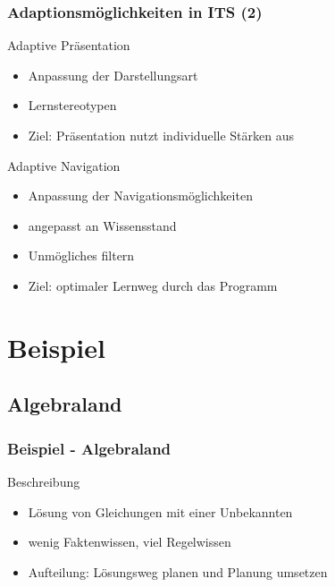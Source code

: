 \documentclass{beamer}
\begin{document}
\begin{frame}
  \frametitle{Adaptionsmöglichkeiten in ITS (2)}

  \begin{block}{Adaptive Präsentation}
    \begin{itemize}
      \item Anpassung der Darstellungsart
      \item Lernstereotypen
      \item Ziel: Präsentation nutzt individuelle Stärken aus
    \end{itemize}
  \end{block}

  \begin{block}{Adaptive Navigation}
    \begin{itemize}
      \item Anpassung der Navigationsmöglichkeiten
      \item angepasst an Wissensstand
      \item Unmögliches filtern
      \item Ziel: optimaler Lernweg durch das Programm
    \end{itemize}
  \end{block}
\end{frame}

\section{Beispiel}
\subsection{Algebraland}
\begin{frame}
  \frametitle{Beispiel - Algebraland}
  \begin{block}{Beschreibung}
    \begin{itemize}
      \item Lösung von Gleichungen mit einer Unbekannten
      \item wenig Faktenwissen, viel Regelwissen
      \item Aufteilung: Lösungsweg planen und Planung umsetzen
    \end{itemize}
  \end{block}
\end{frame}
\end{document}
